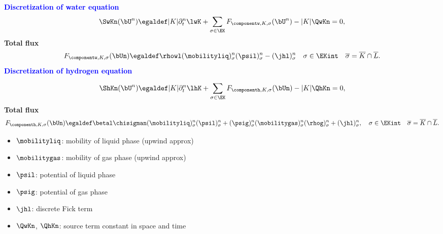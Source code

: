 \documentclass[10 pt]{beamer}
\begin{document}
\begin{frame}
\textcolor{blue}{\textbf{Discretization of water equation}}
\begin{equation*}
\SwKn(\bU^n) \egaldef |K| \partial_t^n \lwK  + \sum_{\sigma \in \EK} {F}_{\componentw,K,\sigma}(\bU^{n})- |K|\QwKn = 0,
\end{equation*}
\textcolor{cadmiumgreen}{\textbf{Total flux}}
\begin{equation*}
{F}_{\componentw,K,\sigma}(\bUn) \egaldef \rhowl (\mobilityliq)_{\sigma}^{n} (\psil)_{\sigma}^{n} - (\jhl)_{\sigma}^{n} \quad \sigma \in \EKint \quad \overline{\sigma} = \overline{K} \cap \overline{L}.
\end{equation*}
\pause
\textcolor{blue}{\textbf{Discretization of hydrogen equation}}

\begin{equation*} 
\ShKn(\bU^n)\egaldef |K| \partial_t^n \lhK + \sum_{\sigma \in \EK} {F}_{\componenth,K,\sigma}(\bUn) - |K| \QhKn = 0,
\label{eq:mass:conservation:equation:hydrogen:green:formula}
\end{equation*}
\textcolor{cadmiumgreen}{\textbf{Total flux}}
\begin{equation*}
\label{eq:total:flux:across:sigma:hydrogen:component}
 {F}_{\componenth,K,\sigma}(\bUn) \egaldef \betal \chisigman (\mobilityliq)_{\sigma}^{n} (\psil)_{\sigma}^{n} + (\psig)_{\sigma}^{n} (\mobilitygas)_{\sigma}^{n} (\rhog)_{\sigma}^{n} + (\jhl)_{\sigma}^{n} , \quad \sigma \in \EKint \quad \overline{\sigma} = \overline{K} \cap \overline{L}.
\end{equation*}
\pause
\begin{minipage}{.47 \linewidth}
\begin{itemize}
\item 
$\mobilityliq$: mobility of liquid phase (upwind approx)
\item 
$\mobilitygas$: mobility of gas phase (upwind approx)
\item
$\psil$: potential of liquid phase
\end{itemize}
\end{minipage}
\hfill
\begin{minipage}{.45 \linewidth}
\begin{itemize}
\item
$\psig$: potential of gas phase
\item
$\jhl$: discrete Fick term\\
\item
  $\QwKn$, $\QhKn$: source term constant in space and time
\end{itemize}
\end{minipage}
\end{frame}
\end{document}
